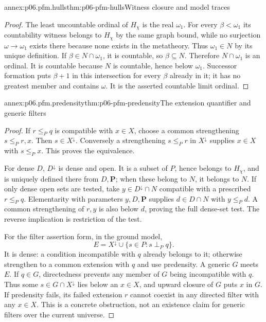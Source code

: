 \begin{annexitem}{annex:p06.pfm.hulls}{thm:p06-pfm-hulls}{Witness closure and model traces}
\begin{proof}
The least uncountable ordinal of \(H_\chi\) is the real \(\omega_1\).
For every \(\beta<\omega_1\) its countability witness belongs to \(H_\chi\)
by the same graph bound, while no surjection \(\omega\to\omega_1\)
exists there because none exists in the metatheory.
Thus \(\omega_1\in N\) by its unique definition.
If \(\beta\in N\cap\omega_1\), it is countable, so \(\beta\subseteq N\).
Therefore \(N\cap\omega_1\) is an ordinal. It is countable because \(N\)
is countable, hence below \(\omega_1\).
Successor formation puts \(\beta+1\) in this intersection for every
\(\beta\) already in it; it has no greatest member and contains \(\omega\).
It is the asserted countable limit ordinal.
\end{proof}
\end{annexitem}

\begin{annexitem}{annex:p06.pfm.predensity}{thm:p06-pfm-predensity}{The extension quantifier and generic filters}
\begin{proof}
If \(r\leq_P q\) is compatible with \(x\in X\), choose a common
strengthening \(s\leq_P r,x\). Then \(s\in X^\downarrow\).
Conversely a strengthening \(s\leq_P r\) in \(X^\downarrow\) supplies
\(x\in X\) with \(s\leq_P x\). This proves the equivalence.

For dense \(D\), \(D^\downarrow\) is dense and open.
It is a subset of \(P\), hence belongs to \(H_\chi\), and is uniquely
defined there from \(D,\mathbf P\); when these belong to \(N\), it
belongs to \(N\). If only dense open sets are tested, take
\(y\in D^\downarrow\cap N\) compatible with a prescribed \(r\leq_P q\).
Elementarity with parameters \(y,D,\mathbf P\) supplies
\(d\in D\cap N\) with \(y\leq_P d\).
A common strengthening of \(r,y\) is also below \(d\), proving the
full dense-set test. The reverse implication is restriction of the test.

For the filter assertion form, in the ground model,
\[
 E=X^\downarrow\cup\{s\in P:s\perp_P q\}.
\]
It is dense: a condition incompatible with \(q\) already belongs to it;
otherwise strengthen to a common extension with \(q\) and use predensity.
A generic \(G\) meets \(E\). If \(q\in G\), directedness prevents any
member of \(G\) being incompatible with \(q\).
Thus some \(s\in G\cap X^\downarrow\) lies below an \(x\in X\),
and upward closure of \(G\) puts \(x\) in \(G\).
If predensity fails, its failed extension \(r\) cannot coexist in any
directed filter with any \(x\in X\). This is a concrete obstruction,
not an existence claim for generic filters over the current universe.
\end{proof}
\end{annexitem}

